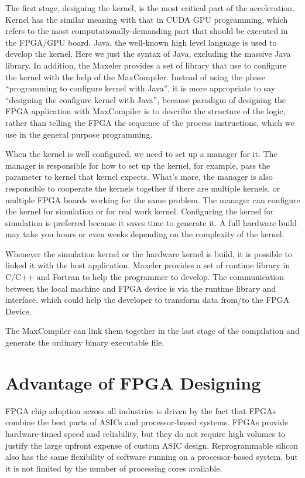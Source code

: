 The first stage, designing the kernel, is the most critical part of the
acceleration. Kernel has the similar meaning with that in CUDA GPU
programming, which refers to the most computationally-demanding part that
should be executed in the FPGA/GPU board. Java, the well-known high level
language is used to develop the kernel. Here we just the syntax of Java,
excluding the massive Java library. In addition, the Maxeler provides a set
of library that use to configure the kernel with the help of the
MaxCompiler. Instead of using the phase ``programming to configure kernel
with Java'', it is more appropriate to say ``designing the configure kernel
with Java'', because paradigm of designing the FPGA application with
MaxCompiler is to describe the structure of the logic, rather than telling
the FPGA the sequence of the process instructions, which we use in the
general purpose programming.

When the kernel is well configured, we need to set up a manager for it. The
manager is responsible for how to set up the kernel, for example, pass the
parameter to kernel that kernel expects. What's more, the manager is also
responsible to cooperate the kernels together if there are multiple
kernels, or multiple FPGA boards working for the same problem. The manager
can configure the kernel for simulation or for real work kernel.
Configuring the kernel for simulation is preferred because it saves time to
generate it. A full hardware build may take you hours or even weeks
depending on the complexity of the kernel.

Whenever the simulation kernel or the hardware kernel is build, it is
possible to linked it with the host application. Maxeler provides a set of
runtime library in C/C++ and Fortran to help the programmer to develop. The
communication between the local machine and FPGA device is via the runtime
library and interface, which could help the developer to transform data
from/to the FPGA Device.

The MaxCompiler can link them together in the last stage of the compilation
and generate the ordinary binary executable file.

\section{Advantage of FPGA Designing}

FPGA chip adoption across all industries is driven by the fact that FPGAs
combine the best parts of ASICs and processor-based systems. FPGAs provide
hardware-timed speed and reliability, but they do not require high volumes
to justify the large upfront expense of custom ASIC design. Reprogrammable
silicon also has the same flexibility of software running on a
processor-based system, but it is not limited by the number of processing
cores available.

